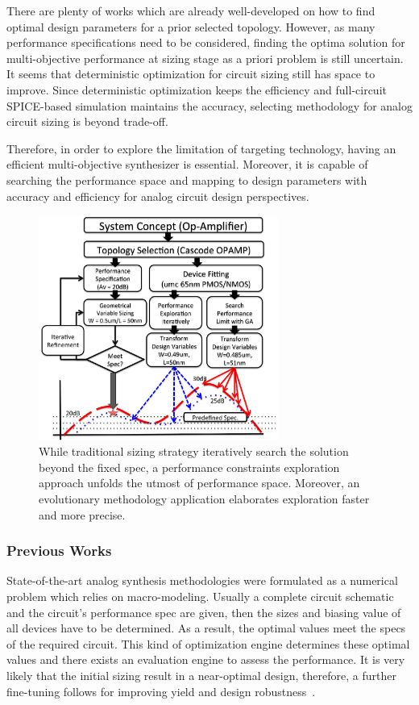       There are plenty of works which are already well-developed on how to find optimal design parameters for a prior selected topology. However, as many performance specifications need to be considered, finding the optima solution for multi-objective performance at sizing stage as a priori problem is still uncertain. It seems that deterministic optimization for circuit sizing still has space to improve. Since deterministic optimization keeps the efficiency and full-circuit SPICE-based simulation maintains the accuracy, selecting methodology for analog circuit sizing is beyond trade-off. 

      Therefore, in order to explore the limitation of targeting technology, having an efficient multi-objective synthesizer is essential. Moreover, it is capable of searching the performance space and mapping to design parameters with accuracy and efficiency for analog circuit design perspectives.

      \begin{figure}[ht]
        \centerline{
        \includegraphics[width=0.7\textwidth]{Fig/Introduction/PerfCons.eps}}
        \caption{While traditional sizing strategy iteratively search the solution beyond the fixed spec, a performance constraints exploration approach unfolds the utmost of performance space. Moreover, an evolutionary methodology application elaborates exploration faster and more precise.} 
        \label{fig:PerfOptimal}
      \end{figure}

      \subsubsection{Previous Works}
        State-of-the-art analog synthesis methodologies were formulated as a numerical problem which relies on macro-modeling. Usually a complete circuit schematic and the circuit's performance spec are given, then the sizes and biasing value of all devices have to be determined. As a result, the optimal values meet the specs of the required circuit. This kind of optimization engine determines these optimal values and there exists an evaluation engine to assess the performance. It is very likely that the initial sizing result in a near-optimal design, therefore, a further fine-tuning follows for improving yield and design robustness~\cite{HierModeling_ProIEEE2007}. 

